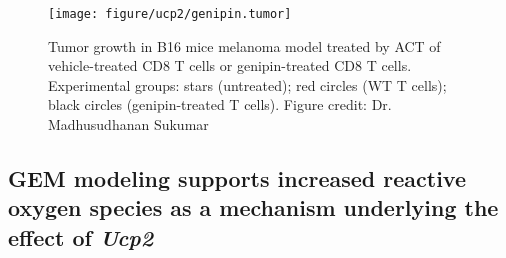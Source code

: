 \documentclass[12pt,twoside,openany,\mydriver]{thesis}  %
\begin{document}
\begin{figure}
\texttt{[image: figure/ucp2/genipin.tumor]} \caption{Tumor growth in B16 mice melanoma model treated by ACT of vehicle-treated CD8 T cells or genipin-treated CD8 T cells. Experimental groups: stars (untreated); red circles (WT T cells); black circles (genipin-treated T cells). Figure credit: Dr. Madhusudhanan Sukumar}\label{fig:ucp2-genipin-tumor}
\end{figure}
\hypertarget{gem-modeling-supports-increased-reactive-oxygen-species-as-a-mechanism-underlying-the-effect-of-ucp2}{%
\subsection{\texorpdfstring{GEM modeling supports increased reactive oxygen species as a mechanism underlying the effect of \emph{Ucp2}}{GEM modeling supports increased reactive oxygen species as a mechanism underlying the effect of Ucp2}}\label{gem-modeling-supports-increased-reactive-oxygen-species-as-a-mechanism-underlying-the-effect-of-ucp2}}
\end{document}
